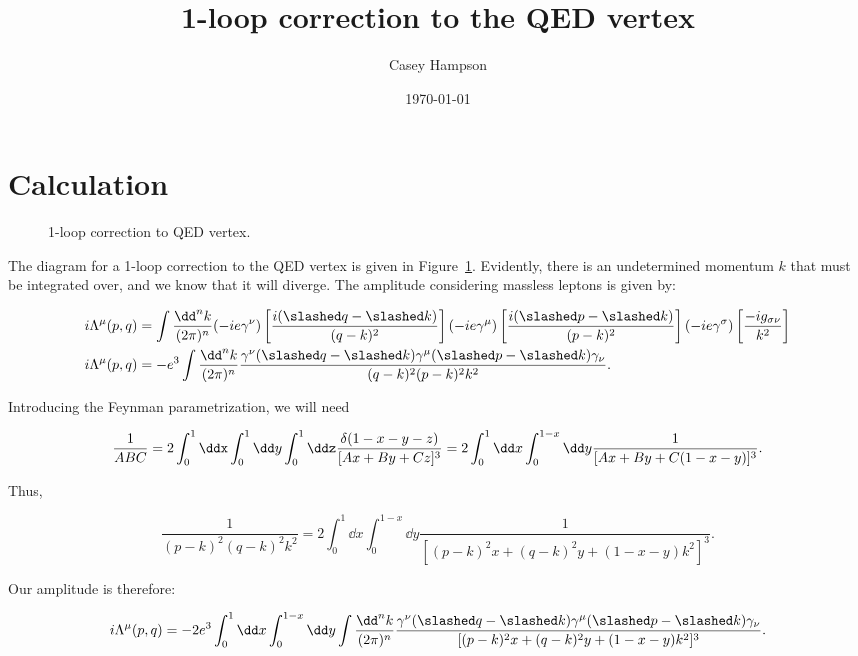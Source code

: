 \documentclass[titlepage]{article}
\title{1-loop correction to the QED vertex}
\date{\today}
\author{Casey Hampson}
\begin{document}
\maketitle
\pagebreak


\section{Calculation}


\begin{figure}[ht]
    \centering
    
    \caption{1-loop correction to QED vertex.}
    \label{fig:MainDiagram}
\end{figure}

The diagram for a 1-loop correction to the QED vertex is given in Figure~\ref{fig:MainDiagram}. Evidently, there is an undetermined momentum $k$ that must be integrated over, and we know that it will diverge. The amplitude considering massless leptons is given by:

\begin{align}
    i\Lambda^{\mu}(p,q) &= \int \frac{\dd^nk}{(2\pi)^n} (-ie\gamma^{\nu})\left[ \frac{i(\qsl - \ksl)}{(q-k)^2} \right] (-ie \gamma^{\mu}) \left[ \frac{i(\psl - \ksl)}{(p-k)^2} \right] (-ie\gamma^{\sigma}) \left[ \frac{-ig_{\sigma\nu}}{k^2} \right] \\
    i\Lambda^{\mu}(p,q) &= -e^3 \int \frac{\dd^nk}{(2\pi)^n} \frac{\gamma^{\nu}(\qsl - \ksl)\gamma^{\mu}(\psl - \ksl)\gamma_{\nu}}{(q-k)^2(p-k)^2k^2}.
\end{align}

Introducing the Feynman parametrization, we will need

\begin{equation}
    \frac{1}{ABC} = 2\int_0^1 \ddx \int_0^1 \dd y \int_0^1 \ddz \frac{\delta(1-x-y-z)}{[Ax + By + Cz]^3} = 2\int_0^1 \dd x \int_0^{1-x}\dd y \frac{1}{[Ax + By + C(1-x-y)]^3}.
\end{equation}

Thus,

\begin{equation}
    \frac{1}{(p-k)^2(q-k)^2k^2} = 2\int_0^1 \dd x \int_0^{1-x} \dd y \frac{1}{[(p-k)^2x + (q-k)^2y + (1-x-y)k^2]^3}.
\end{equation}

Our amplitude is therefore:

\begin{equation}
    i\Lambda^{\mu}(p,q) = -2e^3 \int_0^1 \dd x \int_0^{1-x} \dd y \int \frac{\dd^nk}{(2\pi)^n} \frac{\gamma^{\nu}(\qsl - \ksl)\gamma^{\mu}(\psl - \ksl)\gamma_{\nu}}{[(p-k)^2x + (q-k)^2y + (1-x-y)k^2]^3}.
\end{equation}
\end{document}
